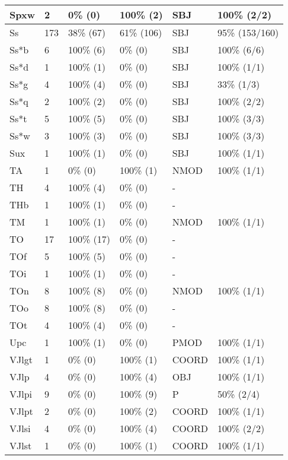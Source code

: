 \begin{figure*}
\begin{tabular}{|l|l|l|l||l|l|}
\hline
 Spxw & 2 & 0\% (0) & 100\% (2) & SBJ & 100\% (2/2) \\ 
\hline
 Ss & 173 & 38\% (67) & 61\% (106) & SBJ & 95\% (153/160) \\ 
\hline
 Ss*b & 6 & 100\% (6) & 0\% (0) & SBJ & 100\% (6/6) \\ 
\hline
 Ss*d & 1 & 100\% (1) & 0\% (0) & SBJ & 100\% (1/1) \\ 
\hline
 Ss*g & 4 & 100\% (4) & 0\% (0) & SBJ & 33\% (1/3) \\ 
\hline
 Ss*q & 2 & 100\% (2) & 0\% (0) & SBJ & 100\% (2/2) \\ 
\hline
 Ss*t & 5 & 100\% (5) & 0\% (0) & SBJ & 100\% (3/3) \\ 
\hline
 Ss*w & 3 & 100\% (3) & 0\% (0) & SBJ & 100\% (3/3) \\ 
\hline
 Sux & 1 & 100\% (1) & 0\% (0) & SBJ & 100\% (1/1) \\ 
\hline
 TA & 1 & 0\% (0) & 100\% (1) & NMOD & 100\% (1/1) \\ 
\hline
 TH & 4 & 100\% (4) & 0\% (0) & - &  \\ 
\hline
 THb & 1 & 100\% (1) & 0\% (0) & - &  \\ 
\hline
 TM & 1 & 100\% (1) & 0\% (0) & NMOD & 100\% (1/1) \\ 
\hline
 TO & 17 & 100\% (17) & 0\% (0) & - &  \\ 
\hline
 TOf & 5 & 100\% (5) & 0\% (0) & - &  \\ 
\hline
 TOi & 1 & 100\% (1) & 0\% (0) & - &  \\ 
\hline
 TOn & 8 & 100\% (8) & 0\% (0) & NMOD & 100\% (1/1) \\ 
\hline
 TOo & 8 & 100\% (8) & 0\% (0) & - &  \\ 
\hline
 TOt & 4 & 100\% (4) & 0\% (0) & - &  \\ 
\hline
 Upc & 1 & 100\% (1) & 0\% (0) & PMOD & 100\% (1/1) \\ 
\hline
 VJlgt & 1 & 0\% (0) & 100\% (1) & COORD & 100\% (1/1) \\ 
\hline
 VJlp & 4 & 0\% (0) & 100\% (4) & OBJ & 100\% (1/1) \\ 
\hline
 VJlpi & 9 & 0\% (0) & 100\% (9) & P & 50\% (2/4) \\ 
\hline
 VJlpt & 2 & 0\% (0) & 100\% (2) & COORD & 100\% (1/1) \\ 
\hline
 VJlsi & 4 & 0\% (0) & 100\% (4) & COORD & 100\% (2/2) \\ 
\hline
 VJlst & 1 & 0\% (0) & 100\% (1) & COORD & 100\% (1/1) \\ 
\hline
\end{tabular}
\end{figure*}
